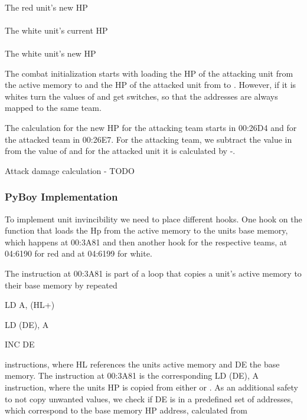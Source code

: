 \paragraph{}
The red unit's new HP
\paragraph{}
The white unit's current HP
\paragraph{}
The white unit's new HP

The combat initialization starts with loading the HP of the attacking unit from the active memory  to  and the HP of the attacked unit from  to . However, if it is whites turn the values of  and  get switches, so that the addresses are always mapped to the same team.

The calculation for the new HP for the attacking team starts in 00:26D4 and for the attacked team in 00:26E7.
For the attacking team, we subtract the value in  from the value of  and for the attacked unit it is calculated by -.

Attack damage calculation - TODO


\subsubsection{PyBoy Implementation}
To implement unit invincibility we need to place different hooks.
One hook on the function that loads the Hp from the active memory to the units base memory, which happens at 00:3A81 and then another hook for the respective teams, at 04:6190 for red and at 04:6199 for white.

The instruction at 00:3A81 is part of a loop that copies a unit's active memory to their base memory by repeated

LD A, (HL+)

LD (DE), A

INC DE

instructions, where HL references the units active memory and DE the base memory. The instruction at 00:3A81 is the corresponding LD (DE), A instruction, where the units HP is copied from either  or .
As an additional safety to not copy unwanted values, we check if DE is in a predefined set of addresses, which correspond to the base memory HP address, calculated from

